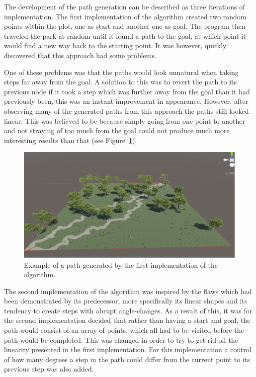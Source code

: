 The development of the path generation can be described as three iterations of implementation.
The first implementation of the algorithm created two random points within the plot, one as start and another one as goal. 
The program then traveled the park at random until it found a path to the goal, at which point it would find a new way back to the starting point. 
It was however, quickly discovered that this approach had some problems.
 
One of these problems was that the paths would look unnatural when taking steps far away from the goal. 
A solution to this was to revert the path to its previous node if it took a step which was further away from the goal than it had previously been, this was an instant improvement in appearance. 
However, after observing many of the generated paths from this approach the paths still looked linear. 
This was believed to be because simply going from one point to another and not straying of too much from the goal could not produce much more interesting results than that (see Figure~\ref{fig:linear}).
\begin{figure}[H]
  \centering
  \includegraphics[width=0.85\linewidth]{figure/linear.png}
  \caption{Example of a path generated by the first implementation of the algorithm.}
  \label{fig:linear}
\end{figure}
The second implementation of the algorithm was inspired by the flaws which had been demonstrated by its predecessor, more specifically its linear shapes and its tendency to create steps with abrupt angle-changes.
As a result of this, it was for the second implementation decided that rather than having a start and goal, the path would consist of an array of points, which all had to be visited before the path would be completed.
This was changed in order to try to get rid off the linearity presented in the first implementation.
For this implementation a control of how many degrees a step in the path could differ from the current point to its previous step was also added.
